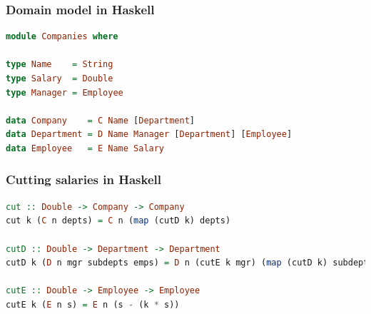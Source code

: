 \documentclass{beamer}
\begin{document}

\begin{frame}[fragile]
  \frametitle{Domain model in Haskell}

  \begin{lstlisting}[language=Haskell]
module Companies where 

type Name    = String
type Salary  = Double
type Manager = Employee 

data Company    = C Name [Department]
data Department = D Name Manager [Department] [Employee]
data Employee   = E Name Salary

  \end{lstlisting}  
\end{frame}

\begin{frame}[fragile]
  \frametitle{Cutting salaries in Haskell}

  \begin{lstlisting}[language=Haskell]
cut :: Double -> Company -> Company
cut k (C n depts) = C n (map (cutD k) depts)

cutD :: Double -> Department -> Department
cutD k (D n mgr subdepts emps) = D n (cutE k mgr) (map (cutD k) subdepts) (map (cutE k) emps)

cutE :: Double -> Employee -> Employee
cutE k (E n s) = E n (s - (k * s)) 
  \end{lstlisting}  
\end{frame}
\end{document}
